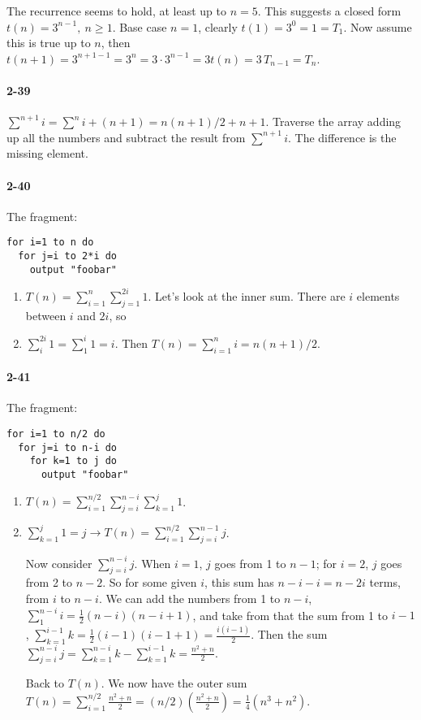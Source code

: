 \documentclass{report}
\begin{document}
The recurrence seems to hold, at least up to $n=5$. This suggests a closed form $t(n) = 3^{n-1},\ n \ge 1$. Base case $n=1$, clearly $t(1) = 3^0 = 1 = T_1$. Now assume this is true up to $n$, then $t(n+1) = 3^{n+1-1} = 3^n = 3\cdot3^{n-1} = 3t(n) = 3\,T_{n-1} = T_n$.

\paragraph{2-39} $\sum^{n+1} i = \sum^n i + (n+1) = n(n+1)/2 + n + 1$. Traverse the array adding up all the numbers and subtract the result from $\sum^{n+1} i$. The difference is the missing element.

\paragraph{2-40} The fragment:
\begin{lstlisting}
for i=1 to n do
  for j=i to 2*i do
    output "foobar"
\end{lstlisting}
\begin{enumerate}[label=\alph*.]
	\item $T(n) = \sum_{i=1}^n \sum_{j=1}^{2i} 1$. Let's look at the inner sum. There are $i$ elements between $i$ and $2i$, so
	\item $\sum_i^{2i} 1 = \sum_1^i 1 = i$. Then $T(n) = \sum_{i=1}^n i = n(n+1)/2$.
\end{enumerate}

\paragraph{2-41} The fragment:
\begin{lstlisting}
for i=1 to n/2 do
  for j=i to n-i do
    for k=1 to j do
      output "foobar"
\end{lstlisting}
\begin{enumerate}[label=\alph*.]
	\item $T(n) = \sum_{i=1}^{n/2} \sum_{j=i}^{n-i} \sum_{k=1}^j 1$.
	\item $\sum_{k=1}^j 1 = j \to T(n) = \sum_{i=1}^{n/2} \sum_{j=i}^{n-1} j$.

	Now consider $\sum_{j=i}^{n-i} j$. When $i = 1$, $j$ goes from 1 to $n-1$; for $i=2$, $j$ goes from 2 to $n-2$. So for some given $i$, this sum has $n-i-i = n-2i$ terms, from $i$ to $n-i$. We can add the numbers from 1 to $n-i$, $\sum_1^{n-i} i = \frac{1}{2}(n-i)(n-i+1)$, and take from that the sum from 1 to $i-1$, $\sum_{k=1}^{i-1} k = \frac{1}{2}(i-1)(i-1+1) = \frac{i(i-1)}{2}$. Then the sum $\sum_{j=i}^{n-i} j = \sum_{k=1}^{n-i} k - \sum_{k=1}^{i-1} k = \frac{n^2+n}{2}$.

	Back to $T(n)$. We now have the outer sum $T(n) = \sum_{i=1}^{n/2} \frac{n^2+n}{2} = (n/2)(\frac{n^2+n}{2}) = \frac{1}{4}(n^3 + n^2)$.
\end{enumerate}
\end{document}
